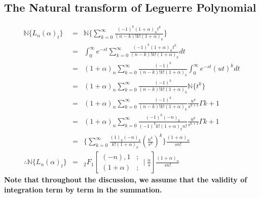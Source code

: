  \subsection{The Natural transform of Leguerre Polynomial}
 \begin{eqnarray*}
 \mathbb{N}\lbrace L_{n}(\alpha)_{t}\rbrace &=& \mathbb{N}\lbrace { \sum_{k=0}^{\infty} \frac{(-1)^{k}(1+\alpha)_{n}t^{k}}{(n-k)!k!(1+\alpha)_{k}}}\rbrace\\
   &=&\int_{0}^{\infty} e^{-st} \sum_{k=0}^{\infty} \frac{(-1)^{k}(1+\alpha)_{n}t^{k}}{(n-k)!k!(1+\alpha)_{k}}dt\\
  &=&(1+\alpha)_{n} \sum_{k=0}^{\infty} \frac{(-1)^{k}}{(n-k)!k!(1+\alpha)_{k}}\int_{0}^{\infty} e^{-st}(ut)^{k}dt\\
  &=&(1+\alpha)_{n} \sum_{k=0}^{\infty} \frac{(-1)^{k}}{(n-k)!k!(1+\alpha)_{k}}\mathbb{N}\lbrace t^{k}\rbrace\\
  &=&(1+\alpha)_{n} \sum_{k=0}^{\infty} \frac{(-1)^{k}}{(n-k)!k!(1+\alpha)_{k}}\frac{u^{k}}{s^{k+1}}\Gamma{k+1}\\
  &=&(1+\alpha)_{n} \sum_{k=0}^{\infty} \frac{(-1)^{k}(-n)_{k}}{(-1)^{k}k!(1+\alpha)_{k}n!}\frac{u^{k}}{s^{k+1}}\Gamma{k+1}\\
 &=&\lbrace \sum_{k=0}^{\infty} \frac{(1)_{k}(-n)_{k}}{k!(1+\alpha)_{k}}\left( \frac{u^{k}}{s^{k}}\right)^{k} \rbrace\frac{(1+\alpha)_{n}}{sn!}\\
  \therefore \mathbb{N}\lbrace{ L_{n}(\alpha)_{t}}\rbrace &=& {}_2 F_1\left[ \begin{array}{cc}
            (-n),1     &;\\
   (1+\alpha) &; 
  \end{array}
 \mid{\frac{u}{s}}
 \right]\frac{(1+\alpha)_{n}}{s n!} 
 \end{eqnarray*}
 \textbf{Note that throughout the discussion, we assume that the validity of integration term by term in the summation.}
